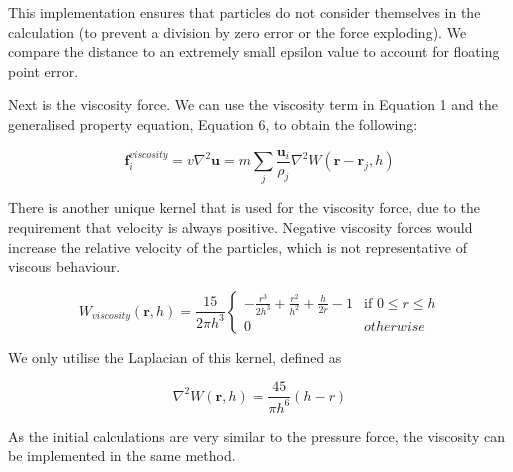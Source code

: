 \documentclass[12pt]{article}
\begin{document}
    This implementation ensures that particles do not consider themselves in the calculation (to prevent a division by zero error or the force exploding). We compare the distance to an extremely small epsilon value to account for floating point error.
    
    Next is the viscosity force. We can use the viscosity term in Equation 1 and the generalised property equation, Equation 6, to obtain the following:

    \begin{equation}
        \textbf{f}^{viscosity}_{i} = v\nabla^2\textbf{u} = m\sum_{j}{\frac{\textbf{u}_i}{\rho_j}\nabla^2{W(\textbf{r} - \textbf{r}_j, h)}}
    \end{equation}

    There is another unique kernel that is used for the viscosity force, due to the requirement that velocity is always positive. Negative viscosity forces would increase the relative velocity of the particles, which is not representative of viscous behaviour.

    \begin{equation}
        W_{viscosity}(\textbf{r}, h) = \frac{15}{2\pi{h}^3}
        \begin{cases}
            -\frac{r^3}{2h^3}+\frac{r^2}{h^2}+\frac{h}{2r} - 1 & \text{if } 0 \leq r \leq h \\
            0 & otherwise
        \end{cases}
    \end{equation}

    We only utilise the Laplacian of this kernel, defined as

    \begin{equation}
        \nabla^2W(\textbf{r}, h) = \frac{45}{\pi{h}^6}(h - r)
    \end{equation}

    As the initial calculations are very similar to the pressure force, the viscosity can be implemented in the same method.
\end{document}
